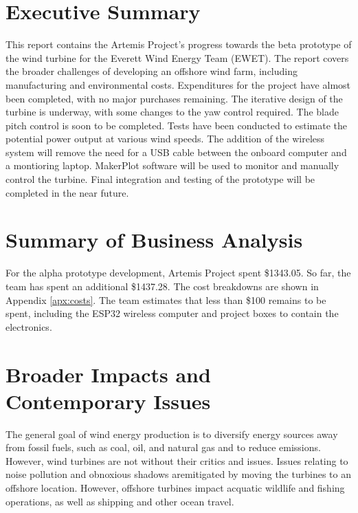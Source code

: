 \documentclass[11pt,letterpaper,conference]{IEEEtran}
\begin{document}
\onecolumn
\tableofcontents
\thispagestyle{plain}
\pagestyle{plain}
\clearpage

\twocolumn
\section{Executive Summary}

This report contains the Artemis Project's progress towards the beta prototype of the wind turbine for the Everett Wind Energy Team (EWET). The report covers the broader challenges of developing an offshore wind farm, including manufacturing and environmental costs. Expenditures for the project have almost been completed, with no major purchases remaining. The iterative design of the turbine is underway, with some changes to the yaw control required. The blade pitch control is soon to be completed. Tests have been conducted to estimate the potential power output at various wind speeds. The addition of the wireless system will remove the need for a USB cable between the onboard computer and a montioring laptop. MakerPlot software will be used to monitor and manually control the turbine. Final integration and testing of the prototype will be completed in the near future.

\section{Summary of Business Analysis}

For the alpha prototype development, Artemis Project spent \$1343.05. So far,
the team has spent an additional \$1437.28. The cost breakdowns are shown in
Appendix \ref{apx:costs}. The team estimates that less than \$100 remains to
be spent, including the ESP32 wireless computer and project boxes to contain the electronics.

\section{Broader Impacts and Contemporary Issues}

The general goal of wind energy production is to diversify energy sources away
from fossil fuels, such as coal, oil, and natural gas and to reduce emissions.
However, wind turbines are not without their critics and issues. Issues relating to noise pollution and obnoxious shadows aremitigated by moving the turbines to an offshore location. However, offshore turbines impact acquatic wildlife and fishing operations, as well as shipping and other ocean travel.
\end{document}
